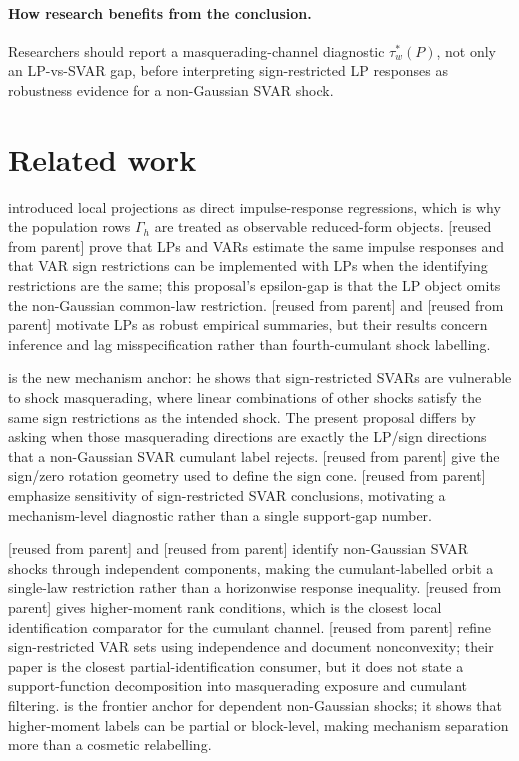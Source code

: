 \documentclass[11pt]{article}
\theoremstyle{definition}
\theoremstyle{plain}
\theoremstyle{remark}
\begin{document}
\paragraph{How research benefits from the conclusion.}
Researchers should report a masquerading-channel diagnostic \(\tau_w^*(P)\), not only an LP-vs-SVAR gap, before interpreting sign-restricted LP responses as robustness evidence for a non-Gaussian SVAR shock.

\section{Related work}
\citet{Jorda2005} introduced local projections as direct impulse-response regressions, which is why the population rows \(\Gamma_h\) are treated as observable reduced-form objects.  \citet{PlagborgMollerWolf2021} [reused from parent] prove that LPs and VARs estimate the same impulse responses and that VAR sign restrictions can be implemented with LPs when the identifying restrictions are the same; this proposal's epsilon-gap is that the LP object omits the non-Gaussian common-law restriction.  \citet{MontielOleaPlagborgMoller2021} [reused from parent] and \citet{MontielOleaPlagborgMollerQianWolf2024} [reused from parent] motivate LPs as robust empirical summaries, but their results concern inference and lag misspecification rather than fourth-cumulant shock labelling.

\citet{Wolf2022} is the new mechanism anchor: he shows that sign-restricted SVARs are vulnerable to shock masquerading, where linear combinations of other shocks satisfy the same sign restrictions as the intended shock.  The present proposal differs by asking when those masquerading directions are exactly the LP/sign directions that a non-Gaussian SVAR cumulant label rejects.  \citet{AriasRubioRamirezWaggoner2018} [reused from parent] give the sign/zero rotation geometry used to define the sign cone.  \citet{BaumeisterHamilton2015} [reused from parent] emphasize sensitivity of sign-restricted SVAR conclusions, motivating a mechanism-level diagnostic rather than a single support-gap number.

\citet{GourierouxMonfortRenne2017} [reused from parent] and \citet{LanneMeitzSaikkonen2017} [reused from parent] identify non-Gaussian SVAR shocks through independent components, making the cumulant-labelled orbit a single-law restriction rather than a horizonwise response inequality.  \citet{Guay2021} [reused from parent] gives higher-moment rank conditions, which is the closest local identification comparator for the cumulant channel.  \citet{DrautzburgWright2023} [reused from parent] refine sign-restricted VAR sets using independence and document nonconvexity; their paper is the closest partial-identification consumer, but it does not state a support-function decomposition into masquerading exposure and cumulant filtering.  \citet{LanneLiuLuoto2026} is the frontier anchor for dependent non-Gaussian shocks; it shows that higher-moment labels can be partial or block-level, making mechanism separation more than a cosmetic relabelling.
\end{document}
